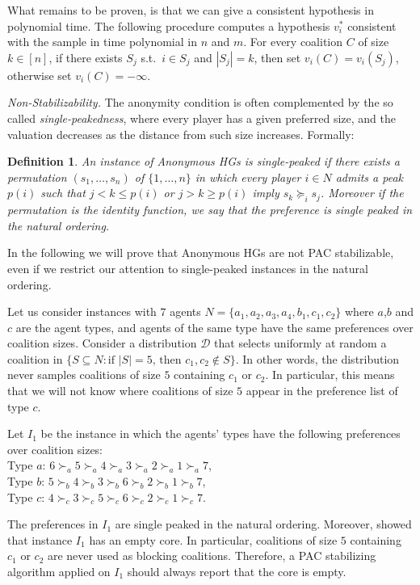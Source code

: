 \documentclass[letterpaper]{article} %
\makeatletter
\newtheorem{definition}[theorem]{Definition}
\newcommand{\distribution}{\mathcal{D}}
\newcommand{\set}[1]{\{#1\}}
\newcommand{\modulus}[1]{\vert #1 \vert}
\newcommand{\proofpart}[1]{%
  \par
  \addvspace{\smallskipamount}%
  \noindent\emph{#1} \hspace{2pt}
}
\makeatother
\begin{document}
What remains to be proven, is that we can give a consistent hypothesis in polynomial time. The following procedure computes a hypothesis $v_i^*$ consistent with the sample in time polynomial in $n$ and $m$. For every coalition $C$ of size $k\in[n]$, if there exists $S_j$ s.t.\ $i\in S_j$ and $|S_j|=k$, then set $v_i(C)=v_i(S_j)$, otherwise set $v_i(C)=-\infty$.
%
\proofpart{Non-Stabilizability.} The anonymity condition is often complemented by the so called \emph{single-peakedness}, where every player has a given preferred size, and the valuation decreases as the distance from such size increases. Formally:
\begin{definition}
An instance of Anonymous HGs is \emph{single-peaked} if there exists a permutation $(s_1, \ldots, s_n)$ of $\{1, \ldots, n\}$ in which every player $i\in N$ admits a \emph{peak} $p(i)$ such that $j<k \leq p(i)$ or $j>k\geq p(i)$ imply $s_k \succeq_i s_j$. Moreover if the permutation is the identity function, we say that the preference is \emph{single peaked in the natural ordering}.
\end{definition}
In the following we will prove that Anonymous HGs are not PAC stabilizable, even if we restrict our attention to single-peaked instances in the natural ordering.

Let us consider instances with $7$ agents $N=\set{a_1, a_2, a_3, a_4, b_1, c_1, c_2}$ where $a$,$b$ and $c$ are the agent types, and agents of the same type have the same preferences over coalition sizes. Consider a distribution $\distribution$ that selects uniformly at random a coalition in  $\set{S \subseteq N : \text{if } \modulus{S}=5 \text{, then } c_1,c_2\not\in S}$. In other words, the distribution never samples coalitions of size $5$ containing $c_1$ or $c_2$. In particular, this means that we will not know where coalitions of size $5$ appear in the preference list of type $c$.

Let $I_1$ be the instance in which the agents' types have the following preferences over coalition sizes:
\\
Type $a$: $6 \succ_a 5 \succ_a 4 \succ_a 3 \succ_a 2 \succ_a 1 \succ_a 7$,
\\
Type $b$: $5 \succ_b 4 \succ_b 3 \succ_b 6 \succ_b 2 \succ_b 1 \succ_b 7$,
\\
Type $c$: $4 \succ_c 3 \succ_c 5 \succ_c 6 \succ_c 2 \succ_c 1 \succ_c 7$.

The preferences in $I_1$ are single peaked in the natural ordering.
Moreover, \citet{Banerjee01} showed that instance $I_1$ has an empty core. In particular, coalitions of size $5$ containing $c_1$ or $c_2$ are never used as blocking coalitions. Therefore, a PAC stabilizing algorithm applied on $I_1$ should always report that the core is empty.
\end{document}
